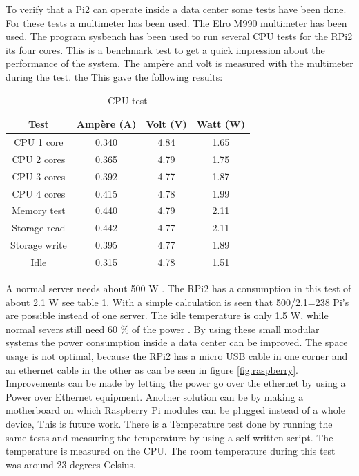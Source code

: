 \documentclass{sig-alternate-br}
\begin{document}
To verify that a Pi2 can operate inside a data center some tests have been done. For these tests a multimeter has been used. The Elro M990 multimeter has been used. The program sysbench has been used to run several CPU tests for the RPi2 its four cores. This is a benchmark test to get a quick impression about the performance of the system. The ampère and volt is measured with the multimeter during the test. the This gave the following results:
\begin{table}[H]
	\centering \caption{CPU test}
	\begin{tabular}{|c|c|c|c|} \hline
		Test & Ampère (A) & Volt (V) & Watt (W)\\ \hline
		CPU 1 core & 0.340 & 4.84  & 1.65\\ \hline
		CPU 2 cores & 0.365 & 4.79 & 1.75\\ \hline
		CPU 3 cores & 0.392 & 4.77 & 1.87 \\ \hline
		CPU 4 cores & 0.415 & 4.78 & 1.99 \\ \hline
		Memory test & 0.440 & 4.79 & 2.11 \\ \hline
		Storage read & 0.442 & 4.77 & 2.11\\ \hline
		Storage write & 0.395 & 4.77 & 1.89 \\ \hline
		Idle & 0.315 & 4.78 & 1.51 \\ \hline
	\end{tabular}
	\label{tab:cpu}
\end{table}
A normal server needs about 500 W \cite{meisner2009powernap}. The RPi2 has a consumption in this test of about 2.1 W see table \ref{tab:cpu}. With a simple calculation is seen that 500/2.1=238 Pi's are possible instead of one server. The idle temperature is only 1.5 W, while normal severs still need 60 \% of the power \cite{meisner2009powernap}. By using these small modular systems the power consumption inside a data center can be improved. The space usage is not optimal, because the RPi2 has a micro USB cable  in one corner and an ethernet cable in the other as can be seen in figure \ref{fig:raspberry}. 
Improvements can be made by letting the power go over the ethernet by using a Power over Ethernet equipment. Another solution can be by making a motherboard on which  Raspberry Pi modules can be plugged instead of a whole device, This is future work. \newline
There is a Temperature test done by running the same tests and measuring the temperature by using a self written script. The temperature is measured on the CPU. The room temperature during this test was around 23 degrees Celsius. 
\end{document}
